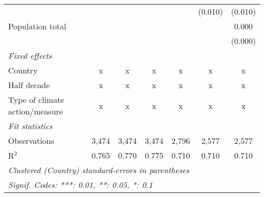 \begin{tabular}{lcccccc}
                                                                                   &               &               &               &               & (0.010)       & (0.010)\\   
   Population total                                                                &               &               &               &               &               & 0.000\\   
                                                                                   &               &               &               &               &               & (0.000)\\   
   \emph{Fixed effects}\\
   Country                                                                         & x             & x             & x             & x             & x             & x\\  
   Half decade                                                                     & x             & x             & x             & x             & x             & x\\  
   Type of climate action/measure                                                  & x             & x             & x             & x             & x             & x\\  
   \midrule \emph{Fit statistics}\\
   Observations                                                                    & 3,474         & 3,474         & 3,474         & 2,796         & 2,577         & 2,577\\  
   R$^2$                                                                           & 0.765         & 0.770         & 0.775         & 0.710         & 0.710         & 0.710\\  
   \midrule
   \multicolumn{7}{l}{\emph{Clustered (Country) standard-errors in parentheses}}\\
   \multicolumn{7}{l}{\emph{Signif. Codes: ***: 0.01, **: 0.05, *: 0.1}}\\
\end{tabular}
\par\endgroup


